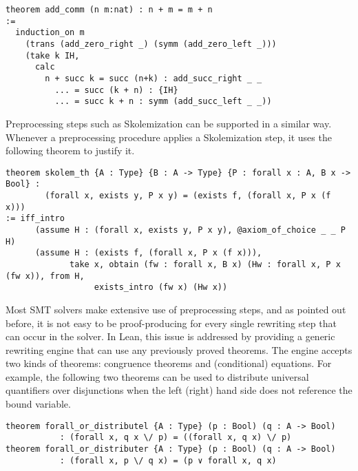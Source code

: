 \documentclass{llncs}
\begin{document}
{\scriptsize
\begin{verbatim}
theorem add_comm (n m:nat) : n + m = m + n
:=
  induction_on m
    (trans (add_zero_right _) (symm (add_zero_left _)))
    (take k IH,
      calc
        n + succ k = succ (n+k) : add_succ_right _ _
          ... = succ (k + n) : {IH}
          ... = succ k + n : symm (add_succ_left _ _))
\end{verbatim}
}

Preprocessing steps such as Skolemization can be supported in
a similar way. Whenever a preprocessing procedure applies a
Skolemization step, it uses the following theorem to justify it.

{\scriptsize
\begin{verbatim}
theorem skolem_th {A : Type} {B : A -> Type} {P : forall x : A, B x -> Bool} :
        (forall x, exists y, P x y) = (exists f, (forall x, P x (f x)))
:= iff_intro
      (assume H : (forall x, exists y, P x y), @axiom_of_choice _ _ P H)
      (assume H : (exists f, (forall x, P x (f x))),
             take x, obtain (fw : forall x, B x) (Hw : forall x, P x (fw x)), from H,
                  exists_intro (fw x) (Hw x))
\end{verbatim}
}

Most SMT solvers make extensive use of preprocessing steps, and as
pointed out before, it is not easy to be proof-producing for every
single rewriting step that can occur in the solver.
In Lean, this issue is addressed by providing a generic rewriting
engine that can use any previously proved theorems. The engine
accepts two kinds of theorems: congruence theorems and (conditional)
equations. For example, the following two theorems can be used to
distribute universal quantifiers over disjunctions when the left
(right) hand side does not reference the bound variable.

{\scriptsize
\begin{verbatim}
theorem forall_or_distributel {A : Type} (p : Bool) (q : A -> Bool)
           : (forall x, q x \/ p) = ((forall x, q x) \/ p)
theorem forall_or_distributer {A : Type} (p : Bool) (q : A -> Bool)
           : (forall x, p \/ q x) = (p ∨ forall x, q x)
\end{verbatim}
}


\end{document}
